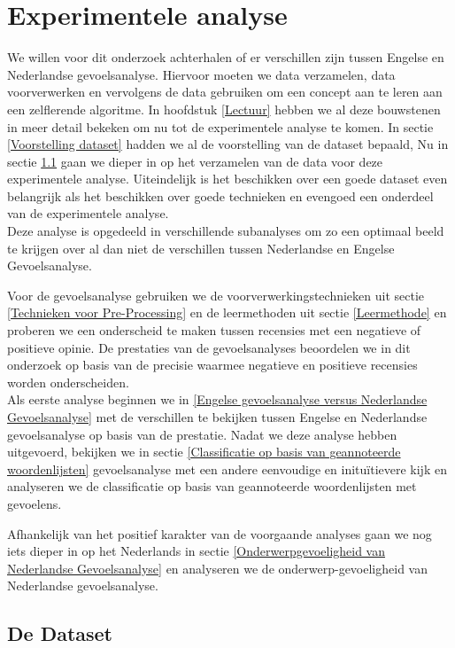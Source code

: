 \chapter{Experimentele analyse}\label{Experiment}

We willen voor dit onderzoek achterhalen of er verschillen zijn tussen Engelse en Nederlandse gevoelsanalyse. Hiervoor moeten we data verzamelen, data voorverwerken en vervolgens de data gebruiken om een concept aan te leren aan een zelflerende algoritme. In hoofdstuk \ref{Lectuur} hebben we al deze bouwstenen in meer detail bekeken om nu tot de experimentele analyse te komen. In sectie \ref{Voorstelling dataset} hadden we al de voorstelling van de dataset bepaald, Nu in sectie \ref{De Dataset} gaan we dieper in op het verzamelen van de data voor deze experimentele analyse. Uiteindelijk is het beschikken over een goede dataset even belangrijk als het beschikken over goede technieken en evengoed een onderdeel van de experimentele analyse.\\
Deze analyse is opgedeeld in verschillende subanalyses om zo een optimaal beeld te krijgen over al dan niet de verschillen tussen Nederlandse en Engelse Gevoelsanalyse. 

Voor de gevoelsanalyse gebruiken we de voorverwerkingstechnieken uit sectie \ref{Technieken voor Pre-Processing} en de leermethoden uit sectie \ref{Leermethode} en proberen we een onderscheid te maken tussen recensies met een negatieve of positieve opinie. De prestaties van de gevoelsanalyses beoordelen we in dit onderzoek op basis van de precisie waarmee negatieve en positieve recensies worden onderscheiden.\\

Als eerste analyse beginnen we in \ref{Engelse gevoelsanalyse versus Nederlandse Gevoelsanalyse} met de verschillen te bekijken tussen Engelse en Nederlandse gevoelsanalyse op basis van de prestatie. Nadat we deze analyse hebben uitgevoerd, bekijken we in sectie \ref{Classificatie op basis van geannoteerde woordenlijsten} gevoelsanalyse met een andere eenvoudige en initu\"itievere kijk en analyseren we de classificatie op basis van geannoteerde woordenlijsten met gevoelens.

Afhankelijk van het positief karakter van de voorgaande analyses gaan we nog iets dieper in op het Nederlands in sectie \ref{Onderwerpgevoeligheid van Nederlandse Gevoelsanalyse} en analyseren we de onderwerp-gevoeligheid van Nederlandse gevoelsanalyse.

\section{De Dataset}\label{De Dataset}

